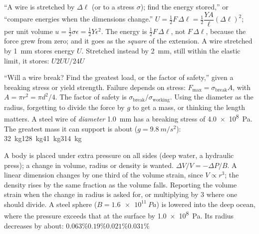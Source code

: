{``A wire is stretched by $\Delta\ell$ (or to a stress $\sigma$); find the energy stored,'' or ``compare
energies when the dimensions change.''}
{$U=\tfrac12F\,\Delta\ell=\tfrac12\dfrac{YA}{\ell}(\Delta\ell)^{2}$; per unit volume
$u=\tfrac12\sigma\epsilon=\tfrac12Y\epsilon^{2}$.}
{The energy is $\tfrac12F\,\Delta\ell$, not $F\,\Delta\ell$, because the force grew from zero; and it goes
as the \emph{square} of the extension.}
{A wire stretched by \SI{1}{mm} stores energy $U$. Stretched instead by \SI{2}{mm}, still within the
elastic limit, it stores:}
{$U$}{$2U$}{$U/2$}{$4U$}

{``Will a wire break? Find the greatest load, or the factor of safety,'' given a breaking stress or yield
strength.}
{Failure depends on stress: $F_{\max}=\sigma_{\text{break}}A$, with $A=\pi r^{2}=\pi d^{2}/4$. The factor of
safety is $\sigma_{\text{break}}/\sigma_{\text{working}}$.}
{Using the diameter as the radius, forgetting to divide the force by $g$ to get a mass, or thinking the
length matters.}
{A steel wire of \emph{diameter} \SI{1.0}{mm} has a breaking stress of \SI{4.0e8}{Pa}. The greatest mass
it can support is about ($g=\SI{9.8}{m/s^2}$):}
{\SI{32}{kg}}{\SI{128}{kg}}{\SI{41}{kg}}{\SI{314}{kg}}

{A body is placed under extra pressure on all sides (deep water, a hydraulic press); a change in volume,
radius or density is wanted.}
{$\Delta V/V=-\Delta P/B$. A linear dimension changes by one third of the volume strain, since
$V\propto r^{3}$; the density rises by the same fraction as the volume falls.}
{Reporting the volume strain when the change in radius is asked for, or multiplying by $3$ where one
should divide.}
{A steel sphere ($B=\SI{1.6e11}{Pa}$) is lowered into the deep ocean, where the pressure exceeds that at
the surface by \SI{1.0e8}{Pa}. Its radius decreases by about:}
{$0.063\%$}{$0.19\%$}{$0.021\%$}{$0.031\%$}

